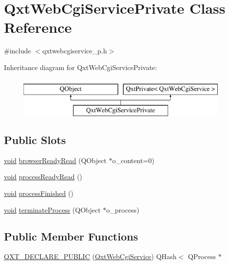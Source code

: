 \hypertarget{class_qxt_web_cgi_service_private}{\section{Qxt\-Web\-Cgi\-Service\-Private Class Reference}
\label{class_qxt_web_cgi_service_private}
}


{\ttfamily \#include $<$qxtwebcgiservice\-\_\-p.\-h$>$}

Inheritance diagram for Qxt\-Web\-Cgi\-Service\-Private\-:\begin{figure}[H]
\begin{center}
\leavevmode
\includegraphics[height=2.000000cm]{class_qxt_web_cgi_service_private}
\end{center}
\end{figure}
\subsection*{Public Slots}
\begin{DoxyCompactItemize}
\item 
\hyperlink{group___u_a_v_objects_plugin_ga444cf2ff3f0ecbe028adce838d373f5c}{void} \hyperlink{class_qxt_web_cgi_service_private_a21279288f08c67a2ff7c3f532ce566d4}{browser\-Ready\-Read} (Q\-Object $\ast$o\-\_\-content=0)
\item 
\hyperlink{group___u_a_v_objects_plugin_ga444cf2ff3f0ecbe028adce838d373f5c}{void} \hyperlink{class_qxt_web_cgi_service_private_abd10f8c2d7e2ab2595613f43ef58d604}{process\-Ready\-Read} ()
\item 
\hyperlink{group___u_a_v_objects_plugin_ga444cf2ff3f0ecbe028adce838d373f5c}{void} \hyperlink{class_qxt_web_cgi_service_private_a469ae037a43ad29c8f95379d1f6a07d9}{process\-Finished} ()
\item 
\hyperlink{group___u_a_v_objects_plugin_ga444cf2ff3f0ecbe028adce838d373f5c}{void} \hyperlink{class_qxt_web_cgi_service_private_aee632a710b984fa7f10c0a21128f2de6}{terminate\-Process} (Q\-Object $\ast$o\-\_\-process)
\end{DoxyCompactItemize}
\subsection*{Public Member Functions}
\begin{DoxyCompactItemize}
\item 
\hyperlink{class_qxt_web_cgi_service_private_ab4e681e473217acc863f028f115d17fe}{Q\-X\-T\-\_\-\-D\-E\-C\-L\-A\-R\-E\-\_\-\-P\-U\-B\-L\-I\-C} (\hyperlink{class_qxt_web_cgi_service}{Qxt\-Web\-Cgi\-Service}) Q\-Hash$<$ Q\-Process $\ast$
\end{DoxyCompactItemize}
